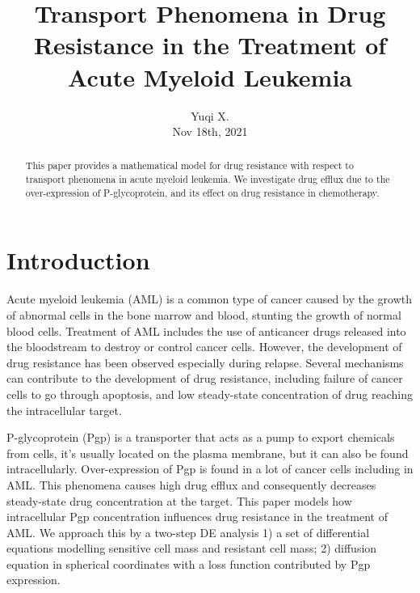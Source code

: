 \documentclass{edm_article}
\begin{document}
\title{Transport Phenomena in Drug Resistance in the Treatment of Acute Myeloid Leukemia}

\author{
Yuqi X.\\
Nov 18th, 2021\\
}

\maketitle

\begin{abstract}
This paper provides a mathematical model for drug resistance with respect to transport phenomena in acute myeloid leukemia. We investigate drug efflux due to the over-expression of P-glycoprotein, and its effect on drug resistance in chemotherapy. 
\end{abstract}


\section{Introduction}
Acute myeloid leukemia (AML) is a common type of cancer caused by the growth of abnormal cells in the bone marrow and blood, stunting the growth of normal blood cells.\cite{AML} Treatment of AML includes the use of anticancer drugs released into the bloodstream to destroy or control cancer cells. However, the development of drug resistance has been observed especially during relapse. Several mechanisms can contribute to the development of drug resistance, including failure of cancer cells to go through apoptosis, and low steady-state concentration of drug reaching the intracellular target.\cite{resistance}

P-glycoprotein (Pgp) is a transporter that acts as a pump to export chemicals from cells, it's usually located on the plasma membrane, but it can also be found intracellularly. Over-expression of Pgp is found in a lot of cancer cells including in AML.\cite{Pgp} This phenomena causes high drug efflux and consequently decreases steady-state drug concentration at the target. This paper models how intracellular Pgp concentration influences drug resistance in the treatment of AML. We approach this by a two-step DE analysis 1) a set of differential equations modelling sensitive cell mass and resistant cell mass; 2) diffusion equation in spherical coordinates with a loss function contributed by Pgp expression.
\end{document}
